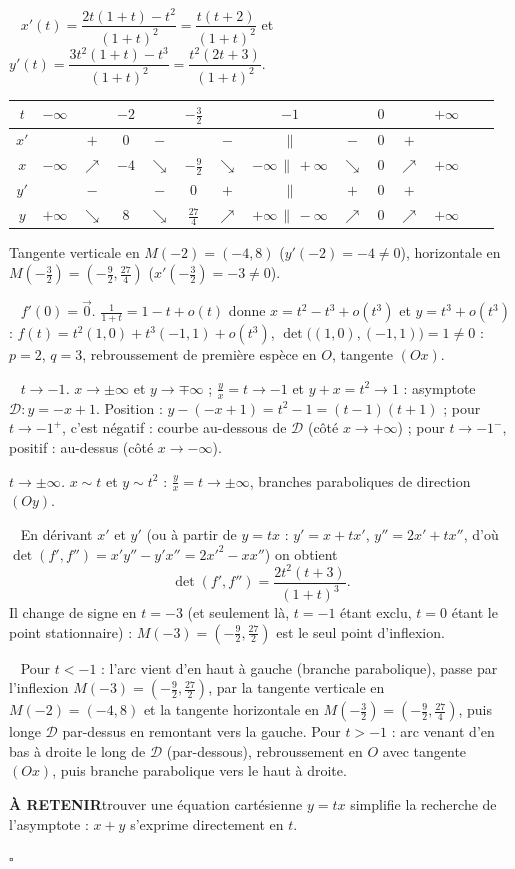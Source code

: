 \documentclass[a4paper,11pt]{article}
\numberwithin{equation}{section}
\numberwithin{figure}{section}
\numberwithin{table}{section}
\theoremstyle{enonce}
\theoremstyle{exemple}
\theoremstyle{remarque}
\newcommand{\ve}[1]{\vec{#1}}
\newcommand{\retenir}[1]{\begin{retenirbox}{\sffamily\bfseries\footnotesize\color{Ocre}À RETENIR}\quad #1\end{retenirbox}}
\newcommand{\q}[1]{\par\smallskip\noindent{\sffamily\bfseries\color{Bleu}#1}\ }
\begin{document}
\q{2.} $x'(t)=\dfrac{2t(1+t)-t^2}{(1+t)^2}=\dfrac{t(t+2)}{(1+t)^2}$ et $y'(t)=\dfrac{3t^2(1+t)-t^3}{(1+t)^2}=\dfrac{t^2(2t+3)}{(1+t)^2}$.
\begin{center}
\renewcommand{\arraystretch}{1.25}
\begin{tabular}{c|ccccccccccccc}
$t$ & $-\infty$ & & $-2$ & & $-\frac32$ & & $-1$ & & $0$ & & $+\infty$\\\hline
$x'$ & & $+$ & $0$ & $-$ & & $-$ & $\|$ & $-$ & $0$ & $+$ & \\
$x$ & $-\infty$ & $\nearrow$ & $-4$ & $\searrow$ & $-\frac92$ & $\searrow$ & $-\infty\,\|\,+\infty$ & $\searrow$ & $0$ & $\nearrow$ & $+\infty$\\
$y'$ & & $-$ & & $-$ & $0$ & $+$ & $\|$ & $+$ & $0$ & $+$ & \\
$y$ & $+\infty$ & $\searrow$ & $8$ & $\searrow$ & $\frac{27}4$ & $\nearrow$ & $+\infty\,\|\,-\infty$ & $\nearrow$ & $0$ & $\nearrow$ & $+\infty$
\end{tabular}
\end{center}
Tangente verticale en $M(-2)=(-4,8)$ ($y'(-2)=-4\neq0$), horizontale en $M\left(-\frac32\right)=\left(-\frac92,\frac{27}4\right)$ ($x'\left(-\frac32\right)=-3\neq0$).

\q{3.} $f'(0)=\ve0$. $\frac1{1+t}=1-t+o(t)$ donne $x=t^2-t^3+o(t^3)$ et $y=t^3+o(t^3)$ :
$f(t)=t^2(1,0)+t^3(-1,1)+o(t^3)$, $\det\big((1,0),(-1,1)\big)=1\neq0$ : $p=2$, $q=3$, rebroussement de première espèce en $O$, tangente $(Ox)$.

\q{4.} \emph{$t\to-1$.} $x\to\pm\infty$ et $y\to\mp\infty$ ; $\frac yx=t\to-1$ et $y+x=t^2\to1$ : asymptote $\mathcal D:y=-x+1$. Position : $y-(-x+1)=t^2-1=(t-1)(t+1)$ ; pour $t\to-1^+$, c'est négatif : courbe au-dessous de $\mathcal D$ (côté $x\to+\infty$) ; pour $t\to-1^-$, positif : au-dessus (côté $x\to-\infty$).

\emph{$t\to\pm\infty$.} $x\sim t$ et $y\sim t^2$ : $\frac yx=t\to\pm\infty$, branches paraboliques de direction $(Oy)$.

\q{5.} En dérivant $x'$ et $y'$ (ou à partir de $y=tx$ : $y'=x+tx'$, $y''=2x'+tx''$, d'où $\det(f',f'')=x'y''-y'x''=2x'^2-xx''$) on obtient
\[\det(f',f'')=\frac{2t^2(t+3)}{(1+t)^3}.\]
Il change de signe en $t=-3$ (et seulement là, $t=-1$ étant exclu, $t=0$ étant le point stationnaire) : $M(-3)=\left(-\frac92,\frac{27}2\right)$ est le seul point d'inflexion.

\q{6.} Pour $t<-1$ : l'arc vient d'en haut à gauche (branche parabolique), passe par l'inflexion $M(-3)=\left(-\frac92,\frac{27}2\right)$, par la tangente verticale en $M(-2)=(-4,8)$ et la tangente horizontale en $M\left(-\frac32\right)=\left(-\frac92,\frac{27}4\right)$, puis longe $\mathcal D$ par-dessus en remontant vers la gauche. Pour $t>-1$ : arc venant d'en bas à droite le long de $\mathcal D$ (par-dessous), rebroussement en $O$ avec tangente $(Ox)$, puis branche parabolique vers le haut à droite.
\retenir{trouver une équation cartésienne $y=tx$ simplifie la recherche de l'asymptote : $x+y$ s'exprime directement en $t$.}
\par\hfill\textcolor{BleuClair}{$\square$}\par
\end{document}
